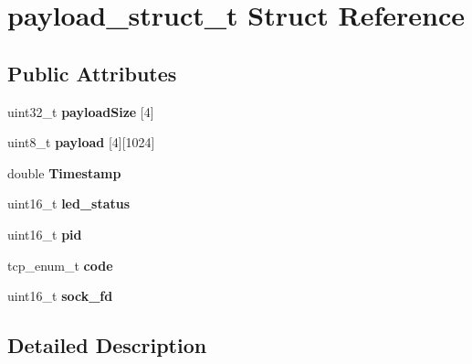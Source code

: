 \hypertarget{structpayload__struct__t}{}\section{payload\+\_\+struct\+\_\+t Struct Reference}
\label{structpayload__struct__t}
\subsection*{Public Attributes}
\begin{DoxyCompactItemize}
\item 
\mbox{\label{structpayload__struct__t_ab703c50dc3c1b90c62fe811e95c7b009}} 
uint32\+\_\+t {\bfseries payload\+Size} \mbox{[}4\mbox{]}
\item 
\mbox{\label{structpayload__struct__t_abc2e8ba68e2ce35eb1501e3c3c0a214f}} 
uint8\+\_\+t {\bfseries payload} \mbox{[}4\mbox{]}\mbox{[}1024\mbox{]}
\item 
\mbox{\label{structpayload__struct__t_a5e0ec8a44c31c07b187d3d01a702bd82}} 
double {\bfseries Timestamp}
\item 
\mbox{\label{structpayload__struct__t_a861c3dc0698906ed0285cb739fcd0f27}} 
uint16\+\_\+t {\bfseries led\+\_\+status}
\item 
\mbox{\label{structpayload__struct__t_a5a5c53a1f8ca731a106b2032ab03d856}} 
uint16\+\_\+t {\bfseries pid}
\item 
\mbox{\label{structpayload__struct__t_a14030b281268bad147d54d48d0293278}} 
tcp\+\_\+enum\+\_\+t {\bfseries code}
\item 
\mbox{\label{structpayload__struct__t_a6a03483453fab9d73091299d92a2cfdc}} 
uint16\+\_\+t {\bfseries sock\+\_\+fd}
\end{DoxyCompactItemize}


\subsection{Detailed Description}


